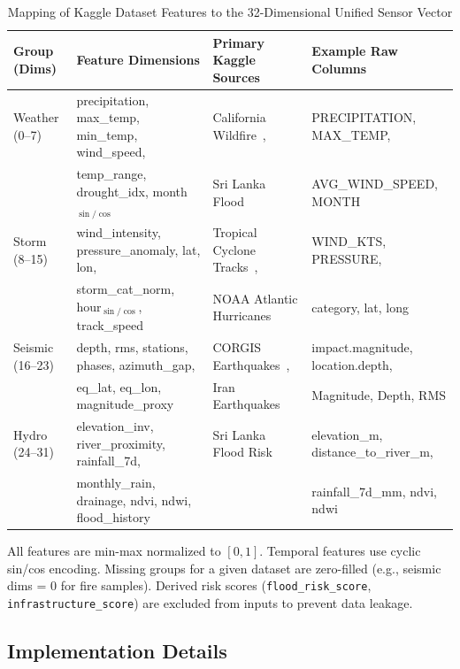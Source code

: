 \documentclass[journal]{IEEEtran}
\begin{document}
\begin{table}[!t]
\centering
\caption{Mapping of Kaggle Dataset Features to the 32-Dimensional Unified Sensor Vector}
\label{tab:feature_mapping}
\begin{tabular}{llll}
\toprule
\textbf{Group (Dims)} & \textbf{Feature Dimensions} & \textbf{Primary Kaggle Sources} & \textbf{Example Raw Columns} \\
\midrule
Weather (0--7) & precipitation, max\_temp, min\_temp, wind\_speed, & California Wildfire~\cite{kaggle_fire}, & PRECIPITATION, MAX\_TEMP, \\
 & temp\_range, drought\_idx, month$_{\sin/\cos}$ & Sri Lanka Flood~\cite{kaggle_srilanka_flood} & AVG\_WIND\_SPEED, MONTH \\
\midrule
Storm (8--15) & wind\_intensity, pressure\_anomaly, lat, lon, & Tropical Cyclone Tracks~\cite{kaggle_cyclone_tracks}, & WIND\_KTS, PRESSURE, \\
 & storm\_cat\_norm, hour$_{\sin/\cos}$, track\_speed & NOAA Atlantic Hurricanes~\cite{kaggle_storm_atl} & category, lat, long \\
\midrule
Seismic (16--23) & depth, rms, stations, phases, azimuth\_gap, & CORGIS Earthquakes~\cite{corgis_eq}, & impact.magnitude, location.depth, \\
 & eq\_lat, eq\_lon, magnitude\_proxy & Iran Earthquakes~\cite{kaggle_eq_iran} & Magnitude, Depth, RMS \\
\midrule
Hydro (24--31) & elevation\_inv, river\_proximity, rainfall\_7d, & Sri Lanka Flood Risk~\cite{kaggle_srilanka_flood} & elevation\_m, distance\_to\_river\_m, \\
 & monthly\_rain, drainage, ndvi, ndwi, flood\_history & & rainfall\_7d\_mm, ndvi, ndwi \\
\bottomrule
\end{tabular}
\vspace{2pt}
\raggedright\scriptsize{All features are min-max normalized to $[0, 1]$. Temporal features use cyclic sin/cos encoding. Missing groups for a given dataset are zero-filled (e.g., seismic dims = 0 for fire samples). Derived risk scores (\texttt{flood\_risk\_score}, \texttt{infrastructure\_score}) are excluded from inputs to prevent data leakage.}
\end{table}

\subsection{Implementation Details}
\end{document}
